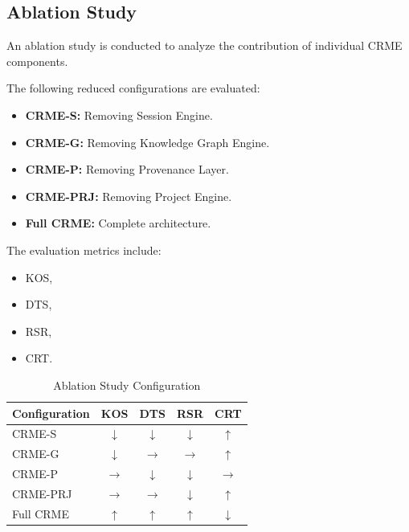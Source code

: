 \subsection{Ablation Study}

An ablation study is conducted to analyze the contribution of individual CRME components.

The following reduced configurations are evaluated:

\begin{itemize}

\item \textbf{CRME-S:} Removing Session Engine.

\item \textbf{CRME-G:} Removing Knowledge Graph Engine.

\item \textbf{CRME-P:} Removing Provenance Layer.

\item \textbf{CRME-PRJ:} Removing Project Engine.

\item \textbf{Full CRME:} Complete architecture.

\end{itemize}


The evaluation metrics include:

\begin{itemize}
\item KOS,
\item DTS,
\item RSR,
\item CRT.
\end{itemize}



\begin{table}[h]
\centering
\caption{Ablation Study Configuration}
\label{tab:ablation_study}

\begin{tabular}{lcccc}

\hline

Configuration & KOS & DTS & RSR & CRT\\

\hline

CRME-S & $\downarrow$ & $\downarrow$ & $\downarrow$ & $\uparrow$\\

CRME-G & $\downarrow$ & $\rightarrow$ & $\rightarrow$ & $\uparrow$\\

CRME-P & $\rightarrow$ & $\downarrow$ & $\downarrow$ & $\rightarrow$\\

CRME-PRJ & $\rightarrow$ & $\rightarrow$ & $\downarrow$ & $\uparrow$\\

Full CRME & $\uparrow$ & $\uparrow$ & $\uparrow$ & $\downarrow$\\

\hline

\end{tabular}

\end{table}



